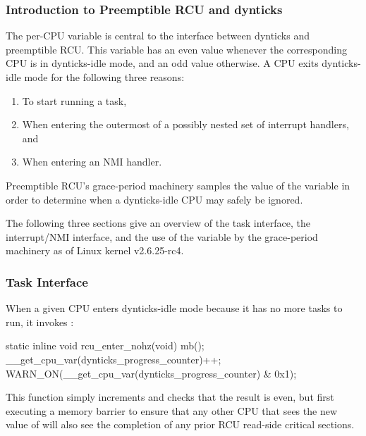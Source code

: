 \subsubsection{Introduction to Preemptible RCU and dynticks}
\label{sec:formal:Introduction to Preemptible RCU and dynticks}

The per-CPU  variable is
central to the interface between dynticks and preemptible RCU.
This variable has an even value whenever the corresponding CPU
is in dynticks-idle mode, and an odd value otherwise.
A CPU exits dynticks-idle mode for the following three reasons:

\begin{enumerate}
\item	To start running a task,
\item	When entering the outermost of a possibly nested set of interrupt
	handlers, and
\item	When entering an NMI handler.
\end{enumerate}

Preemptible RCU's grace-period machinery samples the value of
the  variable in order to
determine when a dynticks-idle CPU may safely be ignored.

The following three sections give an overview of the task
interface, the interrupt/NMI interface, and the use of
the  variable by the
grace-period machinery as of Linux kernel v2.6.25-rc4.

\subsubsection{Task Interface}
\label{sec:formal:Task Interface}

When a given CPU enters dynticks-idle mode because it has no more
tasks to run, it invokes :

\begin{VerbatimN}
static inline void rcu_enter_nohz(void)
{
	mb();
	__get_cpu_var(dynticks_progress_counter)++;
	WARN_ON(__get_cpu_var(dynticks_progress_counter) &
	        0x1);
}
\end{VerbatimN}

This function simply increments  and
checks that the result is even, but first executing a memory barrier
to ensure that any other CPU that sees the new value of
 will also see the completion
of any prior RCU read-side critical sections.

